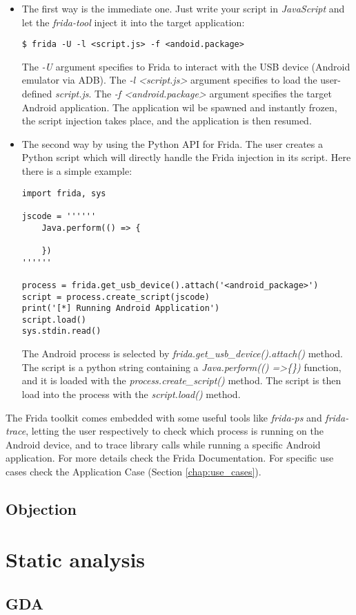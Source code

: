 			\begin{itemize}
				\item The first way is the immediate one. Just write your script in \textit{JavaScript} and let the \textit{frida-tool} inject it into the target application:
\begin{lstlisting}
$ frida -U -l <script.js> -f <andoid.package>
\end{lstlisting}
				The \textit{-U} argument specifies to Frida to interact with the USB device (Android emulator via ADB).\newline
				The \textit{-l <script.js>} argument specifies to load the user-defined \textit{script.js}.\newline
				The \textit{-f <android.package>} argument specifies the target Android application. The application wil be spawned and instantly frozen, the script injection takes place, and the application is then resumed.  
				\item The second way by using the Python API for Frida. The user creates a Python script which will directly handle the Frida injection in its script. Here there is a simple example:
\begin{lstlisting}
import frida, sys

jscode = ''''''
	Java.perform(() => {
	
	})
''''''

process = frida.get_usb_device().attach('<android_package>')
script = process.create_script(jscode)
print('[*] Running Android Application')
script.load()
sys.stdin.read()
\end{lstlisting}
			The Android process is selected by \textit{frida.get\_usb\_device().attach()} method.
			The script is a python string containing a \textit{Java.perform(() =>\{\})} function, and it is loaded with the \textit{process.create\_script()} method.
			The script is then load into the process with the \textit{script.load()} method.
			\end{itemize}
			\par The Frida toolkit comes embedded with some useful tools like \textit{frida-ps} and \textit{frida-trace}, letting the user respectively to check which process is running on the Android device, and to trace library calls while running a specific Android application. For more details check the Frida Documentation\cite{frida}. \newline
			For specific use cases check the Application Case (Section \ref{chap:use_cases}).

		\subsection{Objection}
		
	\section{Static analysis}
		\subsection{GDA}
